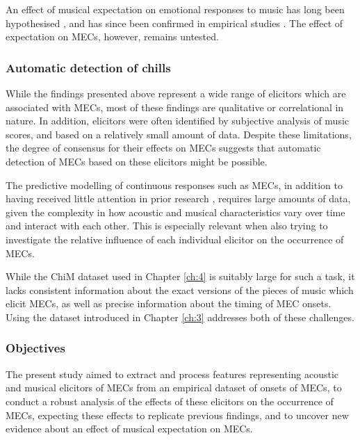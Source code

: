 An effect of musical expectation on emotional responses to music has long been hypothesised \parencite{hanslick1854,meyer1956}, and has since been confirmed in empirical studies \parencite{cheung2019,egermann2013,gold2019,huron2006,juslin2013,sauve2018,steinbeis2006}. The effect of expectation on MECs, however, remains untested.

\subsubsection{Automatic detection of chills}

While the findings presented above represent a wide range of elicitors which are associated with MECs, most of these findings are qualitative or correlational in nature. In addition, elicitors were often identified by subjective analysis of music scores, and based on a relatively small amount of data. Despite these limitations, the degree of consensus for their effects on MECs suggests that automatic detection of MECs based on these elicitors might be possible.

The predictive modelling of continuous responses such as MECs, in addition to having received little attention in prior research \parencite{eerola2018}, requires large amounts of data, given the complexity in how acoustic and musical characteristics vary over time and interact with each other. This is especially relevant when also trying to investigate the relative influence of each individual elicitor on the occurrence of MECs.

While the ChiM dataset used in Chapter \ref{ch:4} is suitably large for such a task, it lacks consistent information about the exact versions of the pieces of music which elicit MECs, as well as precise information about the timing of MEC onsets. Using the dataset introduced in Chapter \ref{ch:3} addresses both of these challenges.

\subsubsection{Objectives}

The present study aimed to extract and process features representing acoustic and musical elicitors of MECs from an empirical dataset of onsets of MECs, to conduct a robust analysis of the effects of these elicitors on the occurrence of MECs, expecting these effects to replicate previous findings, and to uncover new evidence about an effect of musical expectation on MECs.

